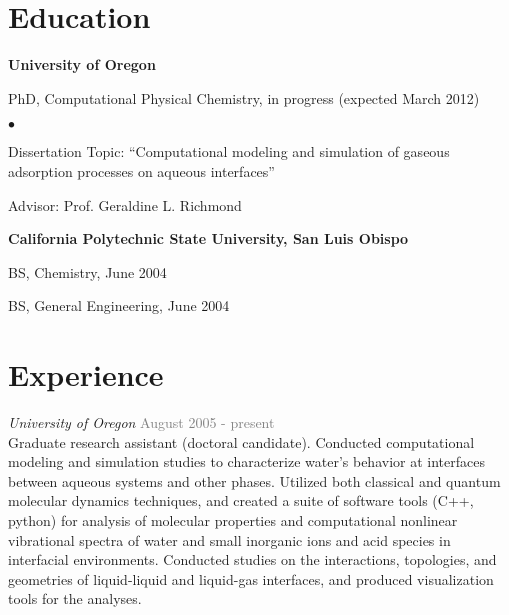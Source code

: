 \documentclass[margin,line]{res}
\newenvironment{list1}{
  \begin{list}{\ding{113}}{%
      \setlength{\itemsep}{0in}
      \setlength{\parsep}{0in} \setlength{\parskip}{0in}
      \setlength{\topsep}{0in} \setlength{\partopsep}{0in} 
      \setlength{\leftmargin}{0.17in}}}{\end{list}}
\newenvironment{list2}{
  \begin{list}{$\bullet$}{%
      \setlength{\itemsep}{0in}
      \setlength{\parsep}{0in} \setlength{\parskip}{0in}
      \setlength{\topsep}{0in} \setlength{\partopsep}{0in} 
      \setlength{\leftmargin}{0.2in}}}{\end{list}}
\begin{document}
\begin{resume}

\section{\sc Education}
{\bf University of Oregon}\\
\vspace*{-.1in}
\begin{list1}
\item[] {\sc PhD}, Computational Physical Chemistry, in progress (expected March 2012) 
\begin{list2}
\item[] Dissertation Topic:  ``Computational modeling and simulation of gaseous adsorption processes on aqueous interfaces''
\item[] Advisor: Prof. Geraldine L. Richmond
\end{list2}
\end{list1}

{\bf California Polytechnic State University, San Luis Obispo}\\
\vspace*{-.1in}
\begin{list1}
\item[] {\sc BS}, Chemistry, June 2004
\item[] {\sc BS}, General Engineering, June 2004
\end{list1}

\section{\sc Experience}

\emph{University of Oregon} \hfill { \textcolor{gray}{August 2005 - present} }\\
\nopagebreak
Graduate research assistant (doctoral candidate).  Conducted computational modeling and simulation studies to characterize water's behavior at interfaces between aqueous systems and other phases. Utilized both classical and quantum molecular dynamics techniques, and created a suite of software tools (C++, python) for analysis of molecular properties and computational nonlinear vibrational spectra of water and small inorganic ions and acid species in interfacial environments. Conducted studies on the interactions, topologies, and geometries of liquid-liquid and liquid-gas interfaces, and produced visualization tools for the analyses.


\end{resume}
\end{document}
